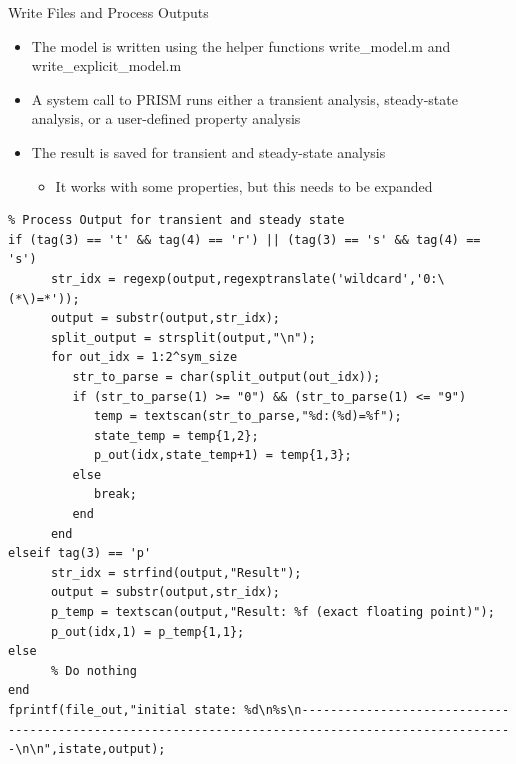 \documentclass[10pt,ignorenonframetext,]{beamer}
\providecommand{\tightlist}{%
  \setlength{\itemsep}{0pt}\setlength{\parskip}{0pt}}
\begin{document}
\begin{frame}[fragile]{Write Files and Process Outputs}
\protect\hypertarget{write-files-and-process-outputs}{}
\begin{itemize}[<+->]
\tightlist
\item
  The model is written using the helper functions write\_model.m and
  write\_explicit\_model.m
\item
  A system call to PRISM runs either a transient analysis, steady-state
  analysis, or a user-defined property analysis
\item
  The result is saved for transient and steady-state analysis

  \begin{itemize}[<+->]
  \tightlist
  \item
    It works with some properties, but this needs to be expanded
  \end{itemize}
\end{itemize}

\begin{verbatim}
% Process Output for transient and steady state
if (tag(3) == 't' && tag(4) == 'r') || (tag(3) == 's' && tag(4) == 's')
      str_idx = regexp(output,regexptranslate('wildcard','0:\(*\)=*'));
      output = substr(output,str_idx);
      split_output = strsplit(output,"\n"); 
      for out_idx = 1:2^sym_size
         str_to_parse = char(split_output(out_idx));
         if (str_to_parse(1) >= "0") && (str_to_parse(1) <= "9")
            temp = textscan(str_to_parse,"%d:(%d)=%f");
            state_temp = temp{1,2};
            p_out(idx,state_temp+1) = temp{1,3};
         else
            break; 
         end
      end
elseif tag(3) == 'p'
      str_idx = strfind(output,"Result");
      output = substr(output,str_idx);
      p_temp = textscan(output,"Result: %f (exact floating point)");
      p_out(idx,1) = p_temp{1,1};
else
      % Do nothing
end
fprintf(file_out,"initial state: %d\n%s\n----------------------------------------------------------------------------------------------------\n\n",istate,output);
\end{verbatim}
\end{frame}
\end{document}
